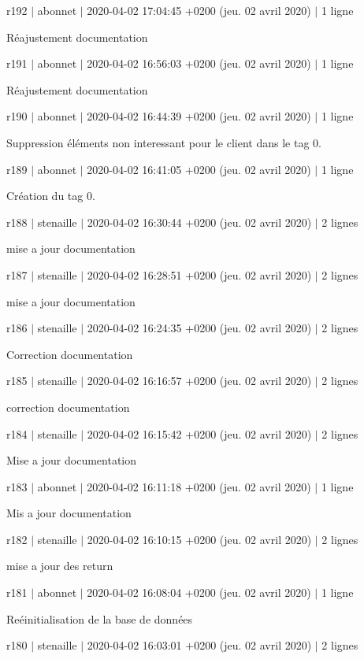 r192 $\vert$ abonnet $\vert$ 2020-\/04-\/02 17\+:04\+:45 +0200 (jeu. 02 avril 2020) $\vert$ 1 ligne

Réajustement documentation

r191 $\vert$ abonnet $\vert$ 2020-\/04-\/02 16\+:56\+:03 +0200 (jeu. 02 avril 2020) $\vert$ 1 ligne

Réajustement documentation

r190 $\vert$ abonnet $\vert$ 2020-\/04-\/02 16\+:44\+:39 +0200 (jeu. 02 avril 2020) $\vert$ 1 ligne

Suppression éléments non interessant pour le client dans le tag 0.

r189 $\vert$ abonnet $\vert$ 2020-\/04-\/02 16\+:41\+:05 +0200 (jeu. 02 avril 2020) $\vert$ 1 ligne

Création du tag 0.

r188 $\vert$ stenaille $\vert$ 2020-\/04-\/02 16\+:30\+:44 +0200 (jeu. 02 avril 2020) $\vert$ 2 lignes

mise a jour documentation

r187 $\vert$ stenaille $\vert$ 2020-\/04-\/02 16\+:28\+:51 +0200 (jeu. 02 avril 2020) $\vert$ 2 lignes

mise a jour documentation

r186 $\vert$ stenaille $\vert$ 2020-\/04-\/02 16\+:24\+:35 +0200 (jeu. 02 avril 2020) $\vert$ 2 lignes

Correction documentation

r185 $\vert$ stenaille $\vert$ 2020-\/04-\/02 16\+:16\+:57 +0200 (jeu. 02 avril 2020) $\vert$ 2 lignes

correction documentation

r184 $\vert$ stenaille $\vert$ 2020-\/04-\/02 16\+:15\+:42 +0200 (jeu. 02 avril 2020) $\vert$ 2 lignes

Mise a jour documentation

r183 $\vert$ abonnet $\vert$ 2020-\/04-\/02 16\+:11\+:18 +0200 (jeu. 02 avril 2020) $\vert$ 1 ligne

Mis a jour documentation

r182 $\vert$ stenaille $\vert$ 2020-\/04-\/02 16\+:10\+:15 +0200 (jeu. 02 avril 2020) $\vert$ 2 lignes

mise a jour des return

r181 $\vert$ abonnet $\vert$ 2020-\/04-\/02 16\+:08\+:04 +0200 (jeu. 02 avril 2020) $\vert$ 1 ligne

Reéinitialisation de la base de données

r180 $\vert$ stenaille $\vert$ 2020-\/04-\/02 16\+:03\+:01 +0200 (jeu. 02 avril 2020) $\vert$ 2 lignes

